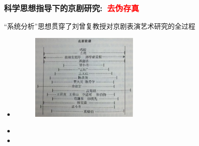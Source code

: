 \frame
{
	\frametitle{科学思想指导下的京剧研究:~\textcolor{red}{去伪存真}}
``系统分析''思想贯穿了刘曾复教授对京剧表演艺术研究的全过程
	\begin{itemize}
		\item \fontsize{8.2pt}{6.2pt}\selectfont{选择可观测、可度量的``广谱型''指标，表征京剧老生演唱和表演风格，评估由此产生的流派风格的影响}%
\begin{figure}[h!]
\centering
\vspace{-0.1in}
\includegraphics[height=0.40\textwidth,width=0.50\textwidth,viewport=0 0 230 185,clip]{Figures_Peking-Opera/Broad_spectrum-analysis.jpg}
\label{Liu_Xinxu-Analysis}
\end{figure}
\item \fontsize{8.2pt}{6.2pt}
\item \fontsize{8.2pt}{6.2pt}\selectfont{应用系统分类的思想，研究京剧脸谱，揭示其内在逻辑，成果斐然}
	\end{itemize}
}


